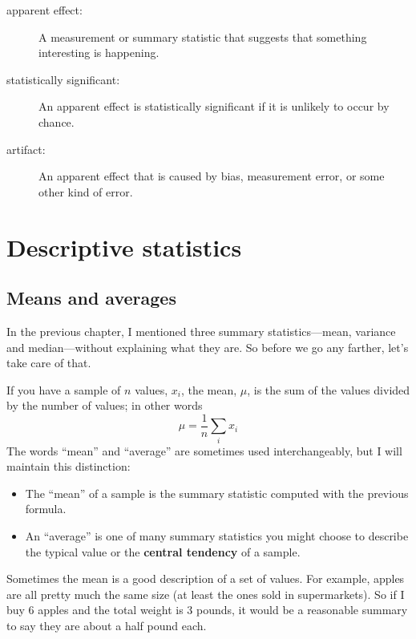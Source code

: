 \documentclass[12pt]{book}
\begin{document}
\begin{description}
\item[apparent effect:] A measurement or summary statistic that
suggests that something interesting is happening.

\item[statistically significant:] An apparent effect is statistically
  significant if it is unlikely to occur by chance.

\item[artifact:] An apparent effect that is caused by bias,
  measurement error, or some other kind of error.

\end{description}





\chapter{Descriptive statistics}
\label{descriptive}

\section{Means and averages}
\label{mean}

In the previous chapter, I mentioned three summary statistics---mean,
variance and median---without explaining what they are.  So before
we go any farther, let's take care of that.

If you have a sample of $n$ values, $x_i$, the mean, $\mu$, is
the sum of the values divided by the number of values; in other words
%
\[ \mu = \frac{1}{n} \sum_i x_i \]
%
The words ``mean'' and ``average'' are sometimes used interchangeably,
but I will maintain this distinction:

\begin{itemize}

\item The ``mean'' of a sample is the summary statistic computed with
  the previous formula.

\item An ``average'' is one of many summary statistics you might
  choose to describe the typical value or the
  {\bf central tendency} of a sample.

\end{itemize}

Sometimes the mean is a good description of a set of values.  For
example, apples are all pretty much the same size (at least the ones
sold in supermarkets).  So if I buy 6 apples and the total weight is 3
pounds, it would be a reasonable summary to say they are about a half
pound each.
\end{document}
